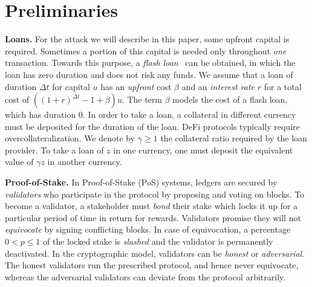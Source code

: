 \section{Preliminaries}\label{sec:preliminaries}


\noindent
\textbf{Loans.} For the attack we will describe in this paper, some upfront
capital is required. Sometimes a portion of this capital is needed only throughout \emph{one}
transaction. Towards this purpose, a \emph{flash loan}~\cite{gudgeon2020defi} can
be obtained, in which the loan has zero duration and does not risk any funds. We assume that
a loan of duration $\Delta t$ for capital $u$ has an \emph{upfront} cost $\beta$
and an \emph{interest rate} $r$ for a total cost of
$((1 + r)^{\Delta t} - 1 + \beta) u$. The term $\beta$ models the cost of a flash loan,
which has duration $0$.
In order to take a loan, a collateral in different currency must be deposited for the duration
of the loan. DeFi protocols typically require overcollateralization. We denote by
$\gamma \geq 1$ the collateral ratio required by the loan provider.
To take a loan of $z$ in one currency, one must deposit the equivalent
value of $\gamma z$ in another currency.

\noindent
\textbf{Proof-of-Stake.} In Proof-of-Stake (PoS) systems, ledgers are secured
by \emph{validators} who participate in the protocol by proposing and voting
on blocks. To become a validator, a stakeholder must \emph{bond} their stake
which locks it up for a particular period of time in return for rewards.
Validators promise they will
not \emph{equivocate} by signing conflicting blocks.
In case of equivocation, a percentage $0 < p \leq 1$ of the locked stake is
\emph{slashed} and the validator is permanently deactivated. In the cryptographic
model, validators can be \emph{honest} or \emph{adversarial}. The honest validators
run the prescribed protocol, and hence never equivocate, whereas the adversarial
validators can deviate from the protocol arbitrarily.


